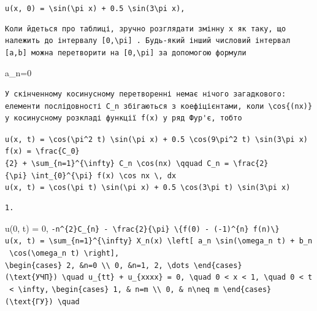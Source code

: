 \documentclass[
  ukrainian,
]{article}
\begin{document}
\texttt{u(x,\ 0)\ =\ \textbackslash{}sin(\textbackslash{}pi\ x)\ +\ 0.5\ \textbackslash{}sin(3\textbackslash{}pi\ x),}

\begin{verbatim}
Коли йдеться про таблиці, зручно розглядати змінну x як таку, що належить до інтервалу [0,\pi] . Будь-який інший числовий інтервал [a,b] можна перетворити на [0,\pi] за допомогою формули
\end{verbatim}

a\_n=0

\begin{verbatim}
У скінченному косинусному перетворенні немає нічого загадкового: елементи послідовності C_n збігаються з коефіцієнтами, коли \cos{(nx)} у косинусному розкладі функції f(x) у ряд Фур'є, тобто
\end{verbatim}

\texttt{u(x,\ t)\ =\ \textbackslash{}cos(\textbackslash{}pi\^{}2\ t)\ \textbackslash{}sin(\textbackslash{}pi\ x)\ +\ 0.5\ \textbackslash{}cos(9\textbackslash{}pi\^{}2\ t)\ \textbackslash{}sin(3\textbackslash{}pi\ x)}
\texttt{f(x)\ =\ \textbackslash{}frac\{C\_0\}\{2\}\ +\ \textbackslash{}sum\_\{n=1\}\^{}\{\textbackslash{}infty\}\ C\_n\ \textbackslash{}cos(nx)\ \textbackslash{}qquad\ C\_n\ =\ \textbackslash{}frac\{2\}\{\textbackslash{}pi\}\ \textbackslash{}int\_\{0\}\^{}\{\textbackslash{}pi\}\ f(x)\ \textbackslash{}cos\ nx\ \textbackslash{},\ dx}
\texttt{u(x,\ t)\ =\ \textbackslash{}cos(\textbackslash{}pi\ t)\ \textbackslash{}sin(\textbackslash{}pi\ x)\ +\ 0.5\ \textbackslash{}cos(3\textbackslash{}pi\ t)\ \textbackslash{}sin(3\textbackslash{}pi\ x)}

\begin{verbatim}
1.
\end{verbatim}

u(0, t) = 0,
\texttt{-n\^{}\{2\}C\_\{n\}\ -\ \textbackslash{}frac\{2\}\{\textbackslash{}pi\}\ \textbackslash{}\{f\textquotesingle{}(0)\ -\ (-1)\^{}\{n\}\ f\textquotesingle{}(n)\textbackslash{}\}}
\texttt{u(x,\ t)\ =\ \textbackslash{}sum\_\{n=1\}\^{}\{\textbackslash{}infty\}\ X\_n(x)\ \textbackslash{}left{[}\ a\_n\ \textbackslash{}sin(\textbackslash{}omega\_n\ t)\ +\ b\_n\ \textbackslash{}cos(\textbackslash{}omega\_n\ t)\ \textbackslash{}right{]},}
\texttt{\textbackslash{}begin\{cases\}\ 2,\ \&n=0\ \textbackslash{}\textbackslash{}\ 0,\ \&n=1,\ 2,\ \textbackslash{}dots\ \textbackslash{}end\{cases\}}
\texttt{(\textbackslash{}text\{УЧП\})\ \textbackslash{}quad\ u\_\{tt\}\ +\ u\_\{xxxx\}\ =\ 0,\ \textbackslash{}quad\ 0\ \textless{}\ x\ \textless{}\ 1,\ \textbackslash{}quad\ 0\ \textless{}\ t\ \textless{}\ \textbackslash{}infty,}
\texttt{\textbackslash{}begin\{cases\}\ 1,\ \&\ n=m\ \textbackslash{}\textbackslash{}\ 0,\ \&\ n\textbackslash{}neq\ m\ \textbackslash{}end\{cases\}}
\texttt{(\textbackslash{}text\{ГУ\})\ \textbackslash{}quad}
\end{document}
